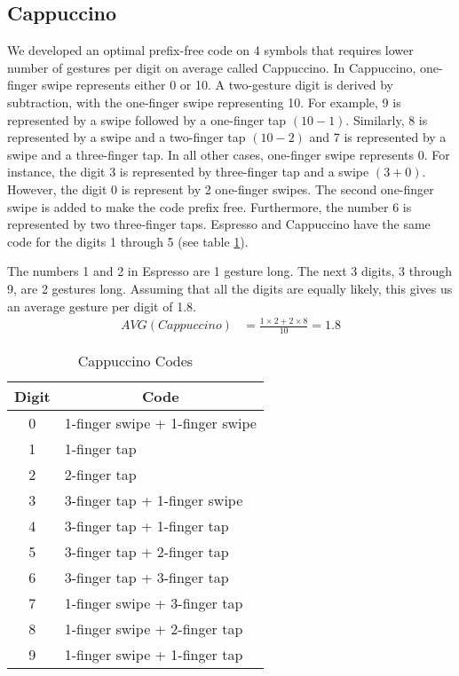 \subsection{Cappuccino}
We developed an optimal prefix-free code on 4 symbols that requires lower number of gestures per digit on average called Cappuccino. In Cappuccino, one-finger swipe represents either 0 or 10. A two-gesture digit is derived by subtraction, with the one-finger swipe representing 10. For example, 9 is represented by a swipe followed by a one-finger tap $(10 - 1)$. Similarly, 8 is represented by a swipe and a two-finger tap $(10 - 2)$ and 7 is represented by a swipe and a three-finger tap. In all other cases, one-finger swipe represents 0. For instance, the digit 3 is represented by three-finger tap and a swipe $(3 + 0)$. However, the digit 0 is represent by 2 one-finger swipes. The second one-finger swipe is added to make the code prefix free. Furthermore, the number 6 is represented by two three-finger taps. Espresso and Cappuccino have the same code for the digits 1 through 5 (see table \ref{cappuccino}).
\par
The numbers 1 and 2 in Espresso are 1 gesture long. The next 3 digits, 3 through 9, are 2 gestures long. Assuming that all the digits are equally likely, this gives us an average gesture per digit of 1.8.
  \begin{align*}
    AVG(Cappuccino) &= \frac{1\times2 + 2\times8}{10} = 1.8
  \end{align*}

\begin{table}[ht]
  \caption{Cappuccino Codes}
  \centering
  \begin{tabular}{cl}
  \hline
  \multicolumn{1}{c}{Digit} & \multicolumn{1}{c}{Code} \\
  \hline
  0 & 1-finger swipe + 1-finger swipe \\
  1 & 1-finger tap \\
  2 & 2-finger tap \\
  3 & 3-finger tap + 1-finger swipe \\
  4 & 3-finger tap + 1-finger tap \\
  5 & 3-finger tap + 2-finger tap \\
  6 & 3-finger tap + 3-finger tap \\
  7 & 1-finger swipe + 3-finger tap \\
  8 & 1-finger swipe + 2-finger tap \\
  9 & 1-finger swipe + 1-finger tap \\ [1ex]
  \hline
  \end{tabular}
  \label{cappuccino}
\end{table}